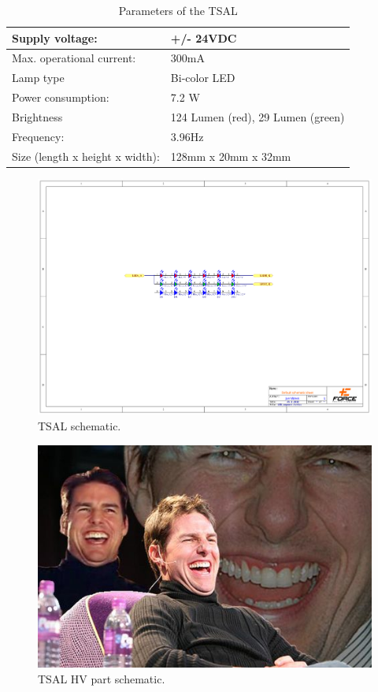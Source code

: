 \begin{table}[H]
	\centering
	\caption{Parameters of the TSAL}
	\begin{tabularx}{\textwidth}{|X|X|}
		\hline
		Supply voltage: & +/- 24VDC \\[\TableSize]
		\hline
		Max. operational current: & 300mA \\[\TableSize]
		\hline
		Lamp type & Bi-color LED \\[\TableSize]
		\hline
		Power consumption: & 7.2 W \\[\TableSize]
		\hline
		Brightness & 124 Lumen (red), 29 Lumen (green) \\[\TableSize]
		\hline
		Frequency: & 3.96Hz \\[\TableSize]
		\hline
		Size (length x height x width): & 128mm x 20mm x 32mm \\[\TableSize]
		\hline
	\end{tabularx}%
	\label{tab:TSAL}%
\end{table}%

\begin{figure}[H]
	\centering
	\includegraphics[width=\textwidth,trim={6cm 10cm 6cm 7cm},clip]{./img/TSAL-schematic.pdf}
	\caption{TSAL schematic.}
	\label{fig:TSAL-schematic}
\end{figure}

\begin{figure}[H]
	\centering
	\includegraphics[width=\textwidth]{./img/tsal-hv.jpg}
	\caption{TSAL HV part schematic.}
	\label{fig:TSAL-HV}
\end{figure}

